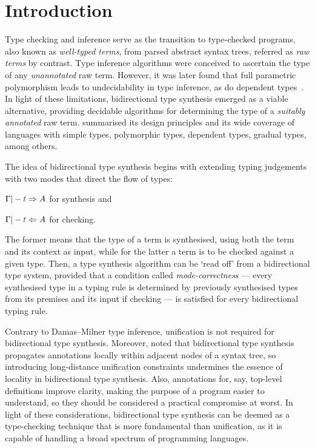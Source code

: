 
\section{Introduction}\label{sec:intro}

Type checking and inference serve as the transition to type-checked programs, also known as \emph{well-typed terms}, from parsed abstract syntax trees, referred as \emph{raw terms} by contrast.
Type inference algorithms were conceived to ascertain the type of any \emph{unannotated} raw term.
However, it was later found that full parametric polymorphism leads to undecidability in type inference, as do dependent types~\citep{Wells1999,Dowek1993}.
In light of these limitations, bidirectional type synthesis emerged as a viable alternative, providing decidable algorithms for determining the type of a \emph{suitably annotated} raw term.
\citet{Dunfield2021} summarised its design principles and its wide coverage of languages with simple types, polymorphic types, dependent types, gradual types, among others. 

The idea of bidirectional type synthesis begins with extending typing judgements with two modes that direct the flow of types:
\begin{enumerate*}
  \item $\Gamma |- \isTerm{t} \syn A$ for synthesis and 
  \item $\Gamma |- \isTerm{t} \chk A$ for checking.
\end{enumerate*}
The former means that the type of a term is synthesised, using both the term and its context as input, while for the latter a term is to be checked against a given type.
Then, a type synthesis algorithm can be `read off' from a bidirectional type system, provided that a condition called \emph{mode-correctness} --- every synthesised type in a typing rule is determined by previously synthesised types from its premises and its input if checking --- is satisfied for every bidirectional typing rule.


Contrary to Damas--Milner type inference, unification is not required for bidirectional type synthesis.
Moreover, \citet{Pierce2000} noted that bidirectional type synthesis propagates annotations locally within adjacent nodes of a syntax tree, so introducing long-distance unification constraints undermines the essence of locality in bidirectional type synthesis.
Also, annotations for, say, top-level definitions improve clarity, making the purpose of a program easier to understand, so they should be considered a practical compromise at worst.
In light of these considerations, bidirectional type synthesis can be deemed as a type-checking technique that is more fundamental than unification, as it is capable of handling a broad spectrum of programming languages. 

